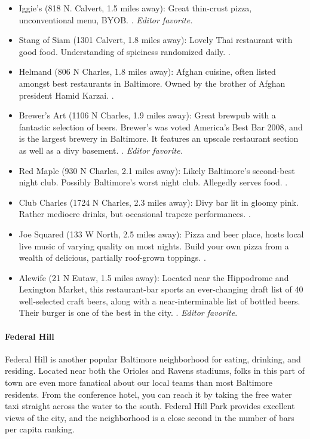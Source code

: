 \begin{itemize}
\item{Iggie's (818 N. Calvert, 1.5 miles away): Great thin-crust pizza, unconventional menu, BYOB. \postdoc. \it{Editor favorite}.}
\item{Stang of Siam (1301 Calvert, 1.8 miles away): Lovely Thai restaurant with good food. Understanding of spiciness randomized daily. \postdoc.}
\item{Helmand (806 N Charles, 1.8 miles away): Afghan cuisine, often listed amongst best restaurants in Baltimore. Owned by the brother of Afghan president Hamid Karzai. \professor.}
\item{Brewer's Art (1106 N Charles, 1.9 miles away): Great brewpub with a fantastic selection of beers. Brewer's was voted America's Best Bar 2008, and is the largest brewery in Baltimore. It features an upscale restaurant section as well as a divy basement. \postdoc. \it{Editor favorite}.}
\item{Red Maple (930 N Charles, 2.1 miles away): Likely Baltimore's second-best night club. Possibly Baltimore's worst night club. Allegedly serves food. \postdoc.}
\item{Club Charles (1724 N Charles, 2.3 miles away): Divy bar lit in gloomy pink. Rather mediocre drinks, but occasional trapeze performances. \gradstudent.}
\item{Joe Squared (133 W North, 2.5 miles away): Pizza and beer place, hosts local live music of varying quality on most nights.  Build your own pizza from a wealth of delicious, partially roof-grown toppings. \postdoc.}
\item{Alewife (21 N Eutaw, 1.5 miles away): Located near the Hippodrome and Lexington Market, this restaurant-bar sports an ever-changing draft list of 40 well-selected craft beers, along with a near-interminable list of bottled beers. Their burger is one of the best in the city. \postdoc. {\it Editor favorite}.}
\end{itemize}


\paragraph*{Federal Hill}
Federal Hill is another popular Baltimore neighborhood for eating, drinking, and residing. Located near both the Orioles and Ravens stadiums, folks in this part of town are even more fanatical about our local teams than most Baltimore residents. From the conference hotel, you can reach it by taking the free water taxi straight across the water to the south. Federal Hill Park provides excellent views of the city, and the neighborhood is a close second in the number of bars per capita ranking. 

